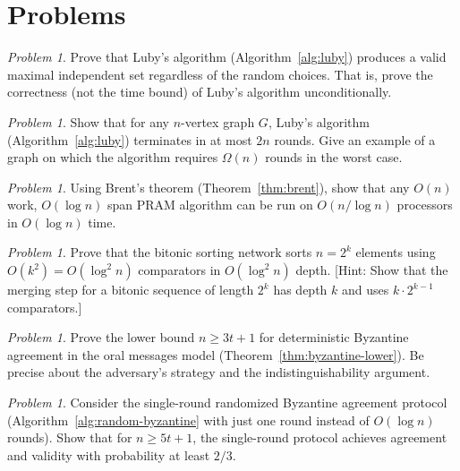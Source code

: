 \documentclass[twoside,12pt]{book}
\theoremstyle{plain}
\theoremstyle{definition}
\theoremstyle{remark}
\newtheorem{problem}[theorem]{Problem}
\begin{document}
\section*{Problems}
\label{sec:parallel-problems}

\begin{problem}
\label{prob:mis-expected}
Prove that Luby's algorithm (Algorithm~\ref{alg:luby}) produces a valid maximal independent set regardless of the random choices. That is, prove the correctness (not the time bound) of Luby's algorithm unconditionally.
\end{problem}

\begin{problem}
\label{prob:mis-rounds}
Show that for any $n$-vertex graph $G$, Luby's algorithm (Algorithm~\ref{alg:luby}) terminates in at most $2n$ rounds. Give an example of a graph on which the algorithm requires $\Omega(n)$ rounds in the worst case.
\end{problem}

\begin{problem}
\label{prob:brent}
Using Brent's theorem (Theorem~\ref{thm:brent}), show that any $O(n)$ work, $O(\log n)$ span PRAM algorithm can be run on $O(n / \log n)$ processors in $O(\log n)$ time.
\end{problem}

\begin{problem}
\label{prob:bitonic-depth}
Prove that the bitonic sorting network sorts $n = 2^k$ elements using $O(k^2) = O(\log^2 n)$ comparators in $O(\log^2 n)$ depth. [Hint: Show that the merging step for a bitonic sequence of length $2^k$ has depth $k$ and uses $k \cdot 2^{k-1}$ comparators.]
\end{problem}

\begin{problem}
\label{prob:byzantine-lower}
Prove the lower bound $n \geq 3t + 1$ for deterministic Byzantine agreement in the oral messages model (Theorem~\ref{thm:byzantine-lower}). Be precise about the adversary's strategy and the indistinguishability argument.
\end{problem}

\begin{problem}
\label{prob:random-byzantine-single}
Consider the single-round randomized Byzantine agreement protocol (Algorithm~\ref{alg:random-byzantine} with just one round instead of $O(\log n)$ rounds). Show that for $n \geq 5t + 1$, the single-round protocol achieves agreement and validity with probability at least $2/3$.
\end{problem}
\end{document}
